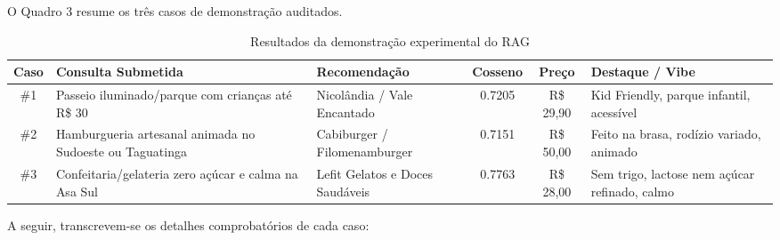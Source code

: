 \documentclass[12pt,a4paper]{article}
\begin{document}
O Quadro 3 resume os três casos de demonstração auditados.

\begin{table}[H]
\centering
\small
\renewcommand{\arraystretch}{1.15}
\caption{Resultados da demonstração experimental do RAG}
\begin{tabularx}{\textwidth}{c p{3.6cm} p{3.2cm} c c X}
\toprule
\textbf{Caso} & \textbf{Consulta Submetida} & \textbf{Recomendação} & \textbf{Cosseno} & \textbf{Preço} & \textbf{Destaque / Vibe} \\
\midrule
\#1 & Passeio iluminado/parque com crianças até R\$ 30 & Nicolândia / Vale Encantado & 0.7205 & R\$ 29,90 & Kid Friendly, parque infantil, acessível \\
\#2 & Hamburgueria artesanal animada no Sudoeste ou Taguatinga & Cabiburger / Filomenamburger & 0.7151 & R\$ 50,00 & Feito na brasa, rodízio variado, animado \\
\#3 & Confeitaria/gelateria zero açúcar e calma na Asa Sul & Lefit Gelatos e Doces Saudáveis & 0.7763 & R\$ 28,00 & Sem trigo, lactose nem açúcar refinado, calmo \\
\bottomrule
\end{tabularx}
\vspace{0.1cm}
\end{table}

A seguir, transcrevem-se os detalhes comprobatórios de cada caso:
\end{document}
